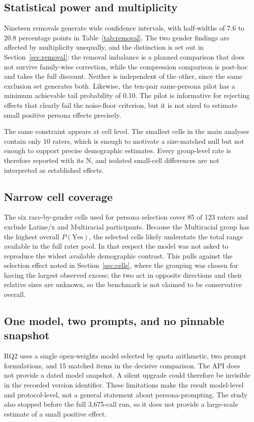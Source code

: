 \documentclass[11pt,a4paper]{article}
\begin{document}
\subsection{Statistical power and multiplicity}
Nineteen removals generate wide confidence intervals, with half-widths of 7.6 to 20.8 percentage points
in Table~\ref{tab:removal}. The two gender findings are affected by multiplicity unequally, and
the distinction is set out in Section~\ref{sec:removal}: the removal imbalance is a planned
comparison that does not survive family-wise correction, while the compression comparison is
post-hoc and takes the full discount. Neither is independent of the other, since the same
exclusion set generates both.
Likewise, the ten-pair same-persona pilot has a minimum achievable tail probability of 0.10. The
pilot is informative for rejecting effects that clearly fail the noise-floor criterion, but it is
not sized to estimate small positive persona effects precisely.

The same constraint appears at cell level. The smallest cells in the main analyses contain only
10 raters, which is enough to motivate a size-matched null but not enough to support precise
demographic estimates. Every group-level rate is therefore reported with its N, and isolated
small-cell differences are not interpreted as established effects.

\subsection{Narrow cell coverage}
The six race-by-gender cells used for persona selection cover 85 of 123 raters and exclude
Latine/x and Multiracial participants. Because the Multiracial group has the highest overall
$P(\text{Yes})$, the selected cells likely understate the total range available in the full rater
pool. In that respect the model was not asked to reproduce the widest available demographic
contrast. This pulls against the selection effect noted in Section~\ref{sec:cells}, where the
grouping was chosen for having the largest observed excess; the two act in opposite directions
and their relative sizes are unknown, so the benchmark is not claimed to be conservative overall.

\subsection{One model, two prompts, and no pinnable snapshot}
RQ2 uses a single open-weights model selected by quota arithmetic, two prompt formulations, and
15 matched items in the decisive comparison. The API does not provide a dated model snapshot. A
silent upgrade could therefore be invisible in the recorded version identifier. These limitations
make the result model-level and protocol-level, not a general statement about persona-prompting.
The study also stopped before the full 3,675-call run, so it does not provide a large-scale
estimate of a small positive effect.
\end{document}
